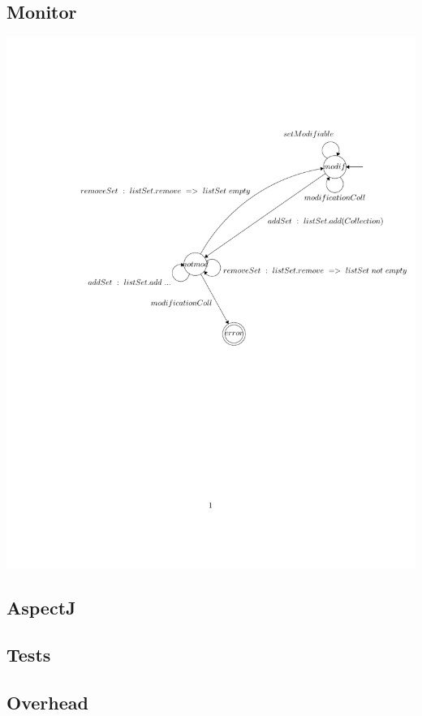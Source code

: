 \documentclass{article}
\begin{document}
\subsection{Monitor}

\begin{center}
\includegraphics[width=16cm, clip, trim=3.5cm 11.5cm 0cm
6.33cm]{hashcode.pdf}
\end{center}

\subsection{AspectJ}

\subsection{Tests}

\subsection{Overhead}
\end{document}
